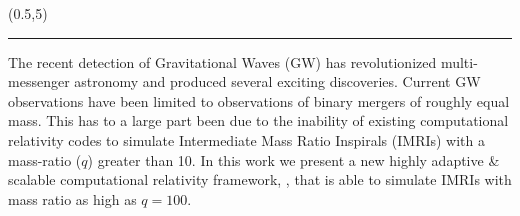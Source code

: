\documentclass[landscape]{a0poster}
\def\Head#1{\noindent{\textbf{\huge\color{Red} #1}}\bigskip}
\begin{document}
\begin{textblock}{9}(0.5,5)
  {\color{DarkBlue}\hrule}\medskip
  \Head{Motivation}

The recent detection of Gravitational Waves (GW) has revolutionized  multi-messenger astronomy and produced several exciting discoveries. Current GW observations have been limited to observations of binary mergers of roughly equal mass. This has to a large part been due to the inability of existing computational relativity codes to simulate Intermediate Mass Ratio Inspirals (IMRIs) with a mass-ratio ($q$) greater than 10. In this work we present a new highly adaptive \& scalable computational relativity framework, \dendrogr, that is able to simulate IMRIs with mass ratio as high as $q=100$. 
\end{textblock} %
\end{document}
